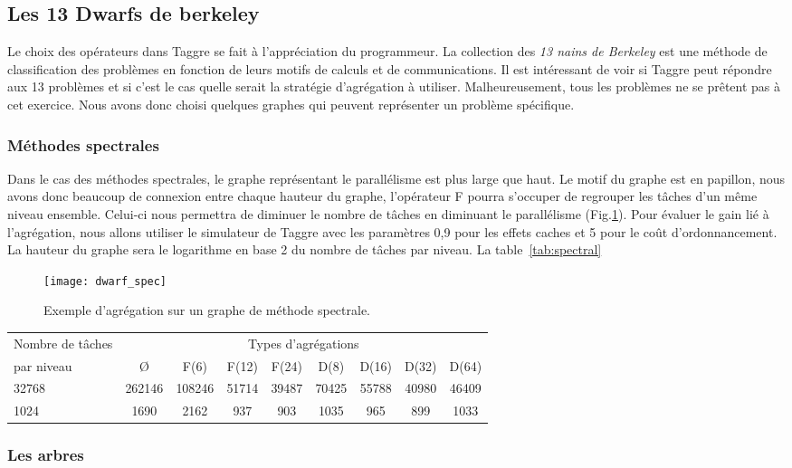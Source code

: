 \subsection{Les 13 Dwarfs de berkeley}
Le choix des opérateurs dans Taggre se fait à l'appréciation du programmeur.
%
La collection des {\em 13 nains de Berkeley}\cite{dwarfs} est une méthode de classification des problèmes en fonction de leurs motifs de calculs et de communications.
%
Il est intéressant de voir si Taggre peut répondre aux 13 problèmes et si c'est le cas quelle serait la stratégie d'agrégation à utiliser.
%
Malheureusement, tous les problèmes ne se prêtent pas à cet exercice.
%
Nous avons donc choisi quelques graphes qui peuvent représenter un problème spécifique.

\subsubsection{Méthodes spectrales}
Dans le cas des méthodes spectrales, le graphe représentant le parallélisme est plus large que haut.
%
Le motif du graphe est en papillon, nous avons donc beaucoup de connexion entre chaque hauteur du graphe, l'opérateur F pourra s'occuper de regrouper les tâches d'un même niveau ensemble.
%
Celui-ci nous permettra de diminuer le nombre de tâches en diminuant le parallélisme (Fig.\ref{fig:dwarf_spec}).
%
Pour évaluer le gain lié à l'agrégation, nous allons utiliser le simulateur de Taggre avec les paramètres 0,9 pour les effets caches et 5 pour le coût d'ordonnancement.
%
La hauteur du graphe sera le logarithme en base 2 du nombre de tâches par niveau.
%
La table~\ref{tab:spectral}

\begin{figure}
  \centering
  \texttt{[image: dwarf\_spec]}
  \caption{Exemple d'agrégation sur un graphe de méthode spectrale.}
  \label{fig:dwarf_spec}
\end{figure}
\begin{center}
  \begin{tabular}{|l|c|c|c|c|c|c|c|c|}
    \hline
   Nombre de tâches &  \multicolumn{8}{c|}{Types d'agrégations}\\
   par niveau & \O & F(6) & F(12) & F(24) & D(8) & D(16) & D(32) & D(64) \\
    \hline
   32768 & 262146 & 108246 & 51714 & 39487 & 70425 & 55788 & 40980 & 46409 \\
   1024  & 1690 & 2162 & 937 & 903 & 1035 & 965 & 899 & 1033 \\
    \hline
  \end{tabular}
  \label{tab:spectral}
\end{center}
\subsubsection{Les arbres}
